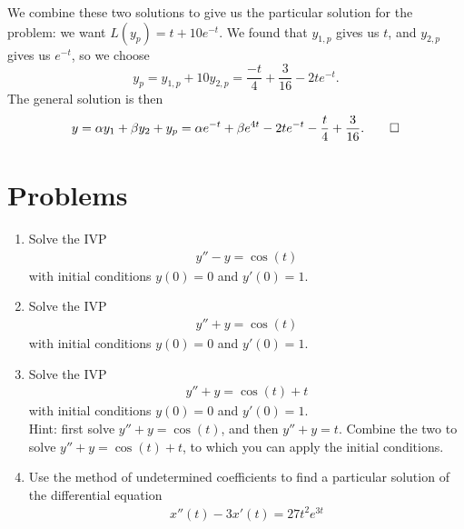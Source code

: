 \documentclass{book}
\begin{document}
We combine these two solutions to give us the particular solution for the
problem: we want $L(y_p) = t+10e^{-t}$. We found that $y_{1,p}$ gives us $t$,
and $y_{2,p}$ gives us $e^{-t}$, so we choose
\begin{equation}
  y_p = y_{1,p} + 10 y_{2,p} = \frac{-t}{4} + \frac{3}{16} -2 t e^{-t}.
\end{equation}
The general solution is then
\begin{equation}
y = \alpha y_1 + \beta y_2 + y_p
= \alpha e^{-t} + \beta e^{4t} -2 t e^{-t} -\frac{t}{4} + \frac{3}{16}. \qed
\end{equation}


\section{Problems}

\begin{enumerate}

\item
  Solve the IVP
  \begin{align*}
  y'' - y = \cos(t)
  \end{align*}
  with initial conditions $y(0)=0$ and $y'(0)=1$.

\item
  Solve the IVP
  \begin{align*}
  y'' + y = \cos(t)
  \end{align*}
  with initial conditions $y(0)=0$ and $y'(0)=1$.

\item
  Solve the IVP
  \begin{align*}
  y'' + y = \cos(t) + t
  \end{align*}
  with initial conditions $y(0)=0$ and $y'(0)=1$.\\
  Hint: first solve $y'' + y = \cos(t)$, and then $y'' + y = t$. Combine
  the two to solve $y'' + y = \cos(t) + t$, to which you can apply the
  initial conditions.

\item
  Use the method of undetermined coefficients to find a particular solution of
  the differential equation
  \begin{align*}
  x''(t) - 3x'(t) = 27t^2e^{3t}
  \end{align*}

\end{enumerate}
\end{document}
